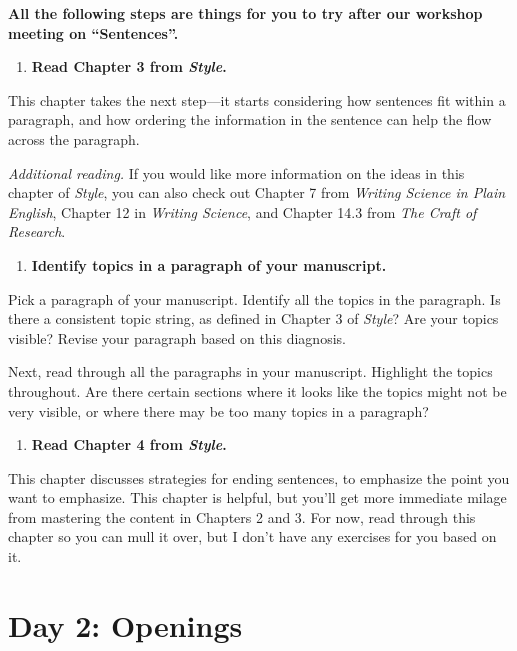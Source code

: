 \documentclass[]{tufte-book}
\providecommand{\tightlist}{%
  \setlength{\itemsep}{0pt}\setlength{\parskip}{0pt}}
\begin{document}
\textbf{All the following steps are things for you to try after our workshop
meeting on ``Sentences''.}

\begin{enumerate}
\def\labelenumi{\arabic{enumi}.}
\setcounter{enumi}{7}
\tightlist
\item
  \textbf{Read Chapter 3 from \emph{Style}.}
\end{enumerate}

This chapter takes the next step---it starts considering how sentences fit
within a paragraph, and how ordering the information in the sentence can
help the flow across the paragraph.

\emph{Additional reading.} If you would like more information on the ideas in this
chapter of \emph{Style}, you can also check out Chapter 7 from \emph{Writing Science in
Plain English}, Chapter 12 in \emph{Writing Science}, and Chapter 14.3 from
\emph{The Craft of Research}.

\begin{enumerate}
\def\labelenumi{\arabic{enumi}.}
\setcounter{enumi}{8}
\tightlist
\item
  \textbf{Identify topics in a paragraph of your manuscript.}
\end{enumerate}

Pick a paragraph of your manuscript. Identify all the topics in the paragraph.
Is there a consistent topic string, as defined in Chapter 3 of \emph{Style}?
Are your topics visible? Revise your paragraph based on this diagnosis.

Next, read through all the paragraphs in your manuscript. Highlight the topics
throughout. Are there certain sections where it looks like the topics might not
be very visible, or where there may be too many topics in a paragraph?

\begin{enumerate}
\def\labelenumi{\arabic{enumi}.}
\setcounter{enumi}{9}
\tightlist
\item
  \textbf{Read Chapter 4 from \emph{Style}.}
\end{enumerate}

This chapter discusses strategies for ending sentences, to emphasize the point
you want to emphasize. This chapter is helpful, but you'll get more immediate
milage from mastering the content in Chapters 2 and 3. For now, read through
this chapter so you can mull it over, but I don't have any exercises for you
based on it.

\hypertarget{day-2-openings}{%
\chapter{Day 2: Openings}\label{day-2-openings}}
\end{document}
